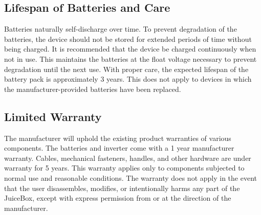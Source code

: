\documentclass[../jb_user_manual.tex]{subfiles}
\begin{document}
\subsection{\Large{Lifespan of Batteries and Care}}

Batteries naturally self-discharge over time.  To prevent degradation of the batteries, the device should not be stored for extended periods of time without being charged.  It is recommended that the device be charged continuously when not in use.  This maintains the batteries at the float voltage necessary to prevent degradation until the next use.  With proper care, the expected lifespan of the battery pack is approximately 3 years.  This does not apply to devices in which the manufacturer-provided batteries have been replaced.

\subsection{\Large{Limited Warranty}}

The manufacturer will uphold the existing product warranties of various components.  The batteries and inverter come with a 1 year manufacturer warranty.  Cables, mechanical fasteners, handles, and other hardware are under warranty for 5 years.  This warranty applies only to components subjected to normal use and reasonable conditions.  The warranty does not apply in the event that the user disassembles, modifies, or intentionally harms any part of the JuiceBox, except with express permission from or at the direction of the manufacturer.
\end{document}
